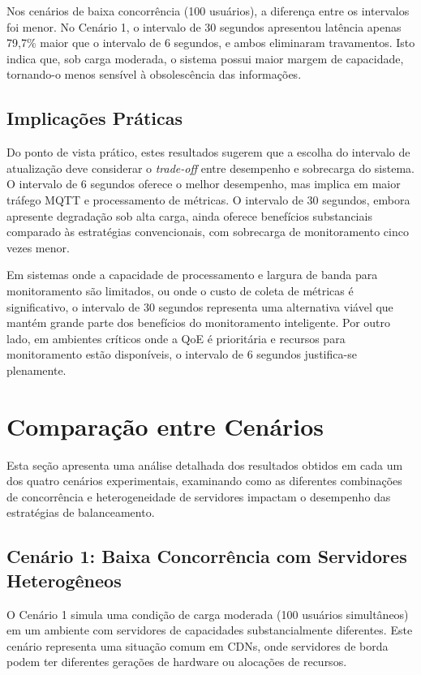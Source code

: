 Nos cenários de baixa concorrência (100 usuários), a diferença entre os intervalos foi menor. No Cenário 1, o intervalo de 30 segundos apresentou latência apenas 79,7\% maior que o intervalo de 6 segundos, e ambos eliminaram travamentos. Isto indica que, sob carga moderada, o sistema possui maior margem de capacidade, tornando-o menos sensível à obsolescência das informações.

\subsection{Implicações Práticas}

Do ponto de vista prático, estes resultados sugerem que a escolha do intervalo de atualização deve considerar o \textit{trade-off} entre desempenho e sobrecarga do sistema. O intervalo de 6 segundos oferece o melhor desempenho, mas implica em maior tráfego MQTT e processamento de métricas. O intervalo de 30 segundos, embora apresente degradação sob alta carga, ainda oferece benefícios substanciais comparado às estratégias convencionais, com sobrecarga de monitoramento cinco vezes menor.

Em sistemas onde a capacidade de processamento e largura de banda para monitoramento são limitados, ou onde o custo de coleta de métricas é significativo, o intervalo de 30 segundos representa uma alternativa viável que mantém grande parte dos benefícios do monitoramento inteligente. Por outro lado, em ambientes críticos onde a QoE é prioritária e recursos para monitoramento estão disponíveis, o intervalo de 6 segundos justifica-se plenamente.

\section{Comparação entre Cenários}

Esta seção apresenta uma análise detalhada dos resultados obtidos em cada um dos quatro cenários experimentais, examinando como as diferentes combinações de concorrência e heterogeneidade de servidores impactam o desempenho das estratégias de balanceamento.

\subsection{Cenário 1: Baixa Concorrência com Servidores Heterogêneos}

O Cenário 1 simula uma condição de carga moderada (100 usuários simultâneos) em um ambiente com servidores de capacidades substancialmente diferentes. Este cenário representa uma situação comum em CDNs, onde servidores de borda podem ter diferentes gerações de hardware ou alocações de recursos.


